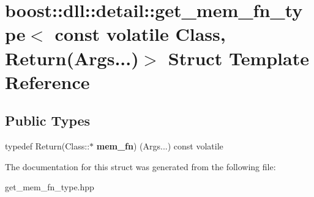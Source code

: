 \hypertarget{a01428}{}\section{boost\+:\+:dll\+:\+:detail\+:\+:get\+\_\+mem\+\_\+fn\+\_\+type$<$ const volatile Class, Return(Args...)$>$ Struct Template Reference}
\label{a01428}
\subsection*{Public Types}
\begin{DoxyCompactItemize}
\item 
\mbox{\label{a01428_ab602b8e22e0bf8ce057196dcf8019694}} 
typedef Return(Class\+::$\ast$ {\bfseries mem\+\_\+fn}) (Args...) const volatile
\end{DoxyCompactItemize}


The documentation for this struct was generated from the following file\+:\begin{DoxyCompactItemize}
\item 
get\+\_\+mem\+\_\+fn\+\_\+type.\+hpp\end{DoxyCompactItemize}
